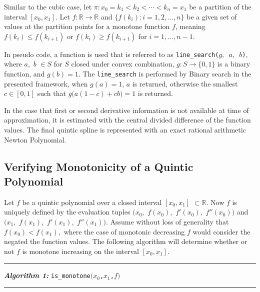 \documentclass{scspaperproc}
\theoremstyle{scsthe}
\begin{document}
Similar to the cubic case, let $\pi: x_0 = k_1 < k_2 < \cdots < k_n = x_1$ be a partition of the interval $[x_0,x_1]$. Let $f: \mathbb{R} \rightarrow \mathbb{R}$ and $\{f(k_i) : i = 1,2,\ldots,n\}$ be a given set of values at the partition points for a monotone function $f$, meaning $f(k_i) \leq f(k_{i+1})$ or $f(k_i) \geq f(k_{i+1})$ for $i = 1, \ldots, n-1$.

In pseudo code, a function is used that is referred to as \texttt{line\_search($g,$ $a,$ $b$)}, where $a,$ $b$ $\in S$ for $S$ closed under convex combination, $g: S \rightarrow \{0,1\}$ is a binary function, and $g(b) = 1$. The \texttt{line\_search} is performed by Binary search in the presented framework, when $g(a) = 1$, $a$ is returned, otherwise the smallest $c \in [0,1]$ such that $g\big(a(1-c) + c b\big) = 1$ is returned.

In the case that first or second derivative information is not available at time of approximation, it is estimated with the central divided difference of the function values. The final quintic spline is represented with an exact rational arithmetic Newton Polynomial. %

\vspace{10pt}


\subsection{Verifying Monotonicity of a Quintic Polynomial}
\label{is_monotone}
Let $f$ be a quintic polynomial over a closed interval $[x_0, x_1]$ $\subset \mathbb{R}$. Now $f$ is uniquely defined by the evaluation tuples $\big(x_0,$ $f(x_0),$ $f'(x_0),$ $f''(x_0)\big)$ and $\big(x_1,$ $f(x_1),$ $f'(x_1),$ $f''(x_1)\big).$ Assume without loss of generality that $f(x_0) < f(x_1),$ where the case of monotonic decreasing $f$ would consider the negated the function values. The following algorithm will determine whether or not $f$ is monotone increasing on the interval $[x_0, x_1].$

\vspace{10pt}%
\hrule%
\vspace{3pt}%
\noindent\textbf{\textit{Algorithm 1:}} \texttt{is\_monotone$\big (x_0$,$x_1$,$f \big)$}%
\vspace{3pt}%
\hrule%
\end{document}
